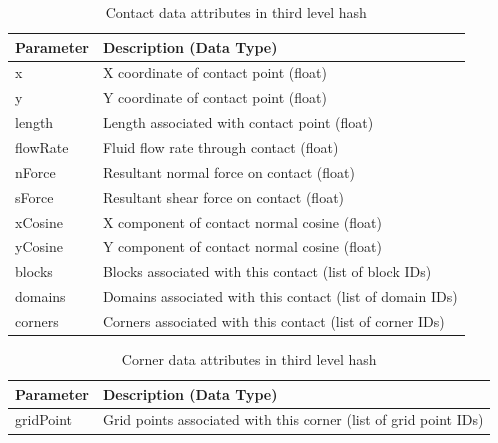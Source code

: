 \begin{table}[!htb]
\centering
\caption{{Contact data attributes in third level hash}}
\label{tab:keys2}
\begin{tabularx}{\textwidth}{@{}Yp{0.75\textwidth}@{}}
\toprule
\textbf{Parameter} & \textbf{Description (Data Type)}                          \\ \midrule
x                  & X coordinate of contact point (float)                     \\
y                  & Y coordinate of contact point (float)                     \\
length             & Length associated with contact point (float)              \\
flowRate           & Fluid flow rate through contact (float)                   \\
nForce             & Resultant normal force on contact (float)                 \\
sForce             & Resultant shear force on contact (float)                  \\
xCosine            & X component of contact normal cosine (float)              \\
yCosine            & Y component of contact normal cosine (float)              \\
blocks             & Blocks associated with this contact (list of block IDs)   \\
domains            & Domains associated with this contact (list of domain IDs) \\
corners            & Corners associated with this contact (list of corner IDs) \\ \bottomrule
\end{tabularx}
\end{table}

\begin{table}[!htb]
\centering
\caption{Corner data attributes in third level hash}
\label{tab:keys3}
\begin{tabularx}{\textwidth}{@{}Yp{0.75\textwidth}@{}}
\toprule
\textbf{Parameter} & \textbf{Description (Data Type)}                                 \\ \midrule
gridPoint          & Grid points associated with this corner (list of grid point IDs) \\ \bottomrule
\end{tabularx}
\end{table}

